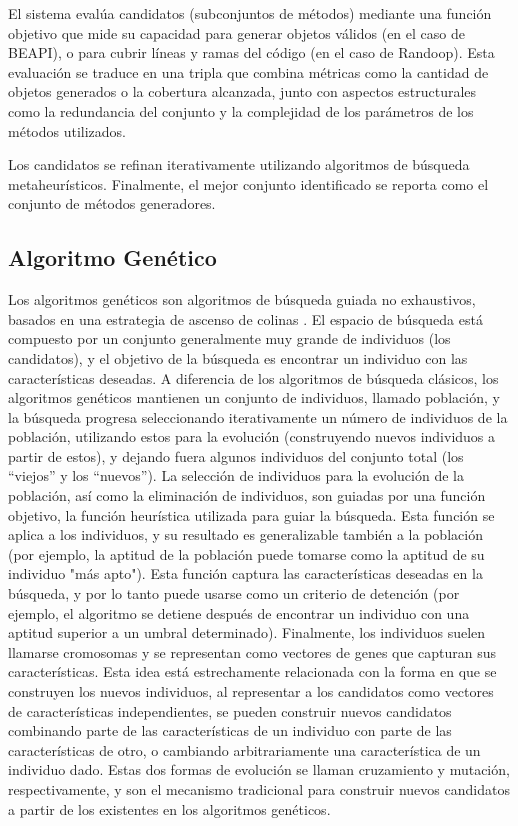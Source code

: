 El sistema evalúa candidatos (subconjuntos de métodos) mediante una función objetivo que mide su capacidad para generar objetos válidos (en el caso de BEAPI), o para cubrir líneas y ramas del código (en el caso de Randoop).
Esta evaluación se traduce en una tripla que combina métricas como la cantidad de objetos generados o la cobertura alcanzada, junto con aspectos estructurales como la redundancia del conjunto y la complejidad de los parámetros de los métodos utilizados.

Los candidatos se refinan iterativamente utilizando algoritmos de búsqueda metaheurísticos. 
Finalmente, el mejor conjunto identificado se reporta como el conjunto de métodos generadores.


\subsection{Algoritmo Genético}
\label{alg:approachGA}

Los algoritmos genéticos \cite{Goldberg:1989} son algoritmos de búsqueda guiada no exhaustivos, 
basados en una estrategia de ascenso de colinas \cite{Russell:2009}. El espacio de búsqueda está 
compuesto por un conjunto generalmente muy grande de individuos (los candidatos), y
el objetivo de la búsqueda es encontrar un individuo con las características deseadas. 
A diferencia de los algoritmos de búsqueda clásicos, los algoritmos genéticos mantienen un conjunto de individuos,
llamado población, y la búsqueda progresa seleccionando iterativamente un número de individuos de la población, 
utilizando estos para la evolución (construyendo nuevos individuos a partir de estos), 
y dejando fuera algunos individuos del conjunto total (los ``viejos'' y los ``nuevos'').
La selección de individuos para la evolución de la población, así como la eliminación de individuos, 
son guiadas por una función objetivo, la función heurística utilizada para guiar la búsqueda. 
Esta función se aplica a los individuos, y su resultado es generalizable también a la población 
(por ejemplo, la aptitud de la población puede tomarse como la aptitud de su individuo "más apto").
Esta función captura las características deseadas en la búsqueda, y por lo tanto puede usarse como un 
criterio de detención (por ejemplo, el algoritmo se detiene después de encontrar un individuo con una 
aptitud superior a un umbral determinado). Finalmente, los individuos suelen llamarse cromosomas y 
se representan como vectores de genes que capturan sus características. Esta idea está estrechamente relacionada 
con la forma en que se construyen los nuevos individuos, al representar a los candidatos como vectores de 
características independientes, se pueden construir nuevos candidatos combinando parte de las características 
de un individuo con parte de las características de otro, o cambiando arbitrariamente una característica de 
un individuo dado. Estas dos formas de evolución se llaman cruzamiento y mutación, respectivamente, y son el 
mecanismo tradicional para construir nuevos candidatos a partir de los existentes en los algoritmos genéticos. 

